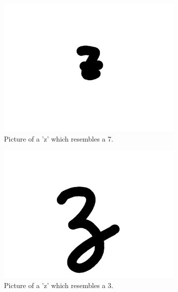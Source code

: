 \documentclass{article}
\begin{document}
\begin{figure}
\begin{subfigure}{.15\textwidth}
  \centering
  \includegraphics[width=\linewidth]{images/bad_char1}
  \caption{Picture of a 'z' which resembles a 7.}
\end{subfigure}
\begin{subfigure}{.15\textwidth}
  \centering
  \includegraphics[width=\linewidth]{images/bad_char2}
  \caption{Picture of a 'z' which resembles a 3.}
\end{subfigure}
\begin{subfigure}{0.15\textwidth}
  \centering

\end{subfigure}
\end{figure}
\end{document}
